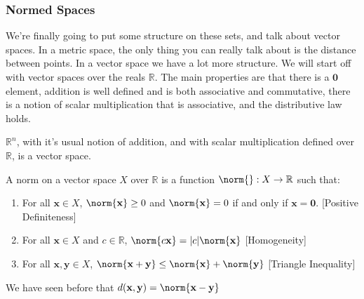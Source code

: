 \documentclass[crop=false,class=article,oneside]{standalone}
\begin{document}
        \subsubsection{Normed Spaces}
            We're finally going to put some structure on these
            sets, and talk about vector spaces. In a metric
            space, the only thing you can really talk about
            is the distance between points. In a vector space
            we have a lot more structure. We will start off
            with vector spaces over the reals $\mathbb{R}$.
            The main properties are that there is a
            $\mathbf{0}$ element, addition is well defined
            and is both associative and commutative,
            there is a notion of scalar multiplication that
            is associative, and the distributive law holds.
            \begin{example}
                $\mathbb{R}^{n}$, with it's usual notion
                of addition, and with scalar multiplication
                defined over $\mathbb{R}$, is a vector space.
            \end{example}
            \begin{definition}
                A norm on a vector space $X$ over $\mathbb{R}$
                is a function $\norm{}:X\rightarrow\mathbb{R}$
                such that:
                \begin{enumerate}
                    \item For all $\mathbf{x}\in{X}$,
                          $\norm{\mathbf{x}}\geq{0}$ and
                          $\norm{\mathbf{x}}=0$ if and only
                          if $\mathbf{x}=\mathbf{0}$.
                          \hfill[Positive Definiteness]
                    \item For all $\mathbf{x}\in{X}$ and
                          $c\in\mathbb{R}$,
                          $\norm{c\mathbf{x}}%
                           =|c|\norm{\mathbf{x}}$
                          \hfill[Homogeneity]
                    \item For all $\mathbf{x},\mathbf{y}\in{X}$,
                          $\norm{\mathbf{x}+\mathbf{y}}%
                           \leq\norm{\mathbf{x}}%
                           +\norm{\mathbf{y}}$
                          \hfill[Triangle Inequality]
                \end{enumerate}
            \end{definition}
            We have seen before that
            $d(\mathbf{x},\mathbf{y})%
             =\norm{\mathbf{x}-\mathbf{y}}$
\end{document}
